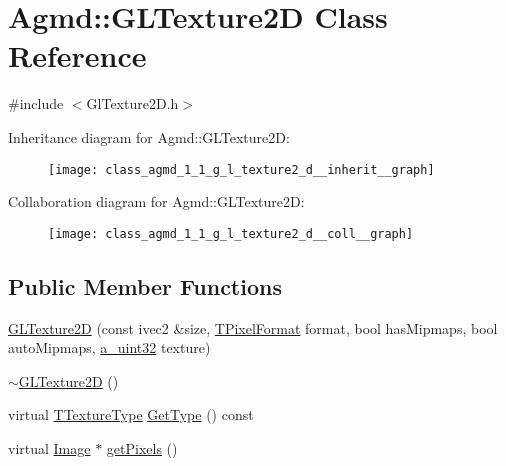 \hypertarget{class_agmd_1_1_g_l_texture2_d}{\section{Agmd\+:\+:G\+L\+Texture2\+D Class Reference}
\label{class_agmd_1_1_g_l_texture2_d}
}


{\ttfamily \#include $<$Gl\+Texture2\+D.\+h$>$}



Inheritance diagram for Agmd\+:\+:G\+L\+Texture2\+D\+:\nopagebreak
\begin{figure}[H]
\begin{center}
\leavevmode
\texttt{[image: class\_agmd\_1\_1\_g\_l\_texture2\_d\_\_inherit\_\_graph]}
\end{center}
\end{figure}


Collaboration diagram for Agmd\+:\+:G\+L\+Texture2\+D\+:\nopagebreak
\begin{figure}[H]
\begin{center}
\leavevmode
\texttt{[image: class\_agmd\_1\_1\_g\_l\_texture2\_d\_\_coll\_\_graph]}
\end{center}
\end{figure}
\subsection*{Public Member Functions}
\begin{DoxyCompactItemize}
\item 
\hyperlink{class_agmd_1_1_g_l_texture2_d_af3f1e6cc445f997df0458e2ad5f800ee}{G\+L\+Texture2\+D} (const ivec2 \&size, \hyperlink{namespace_agmd_afc48fd9fa5dccb4c5621c052bfd1a7ec}{T\+Pixel\+Format} format, bool has\+Mipmaps, bool auto\+Mipmaps, \hyperlink{_common_defines_8h_a964296f9770051b9e4807b1f180dd416}{a\+\_\+uint32} texture)
\item 
\hyperlink{class_agmd_1_1_g_l_texture2_d_ae75b4b2563b012ce68fda2543471c33e}{$\sim$\+G\+L\+Texture2\+D} ()
\item 
virtual \hyperlink{namespace_agmd_a7036bece09449a930cfec410f75e85f4}{T\+Texture\+Type} \hyperlink{class_agmd_1_1_g_l_texture2_d_a67a15cc6c3a7d6bd4474f0bd0ff9685e}{Get\+Type} () const 
\item 
virtual \hyperlink{class_agmd_1_1_image}{Image} $\ast$ \hyperlink{class_agmd_1_1_g_l_texture2_d_a5a085ab09b63cbd3f2135728eb06a208}{get\+Pixels} ()
\end{DoxyCompactItemize}
